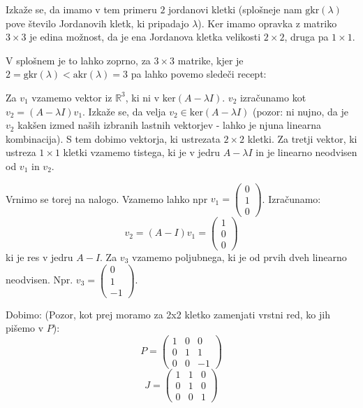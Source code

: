 \documentclass{article}
\begin{document}
\noindent
Izkaže se, da imamo v tem primeru $2$ jordanovi kletki (splošneje nam $\mathrm{gkr}(\lambda)$ pove število Jordanovih kletk, ki pripadajo $\lambda$). Ker imamo opravka z matriko $3 \times 3$ je edina možnost, da je ena Jordanova kletka velikosti $2 \times 2$, druga pa $1 \times1$.

\noindent
V splošnem je to lahko zoprno, za $3 \times 3$ matrike, kjer je $2 = \mathrm{gkr}(\lambda) < \mathrm{akr}(\lambda) = 3$ pa lahko povemo sledeči recept:

\noindent
Za $v_1$ vzamemo vektor iz $\mathbb{R}^3$, ki ni v $\mathrm{ker}(A-\lambda I)$. $v_2$ izračunamo kot $v_2 = (A-\lambda I) v_1$. Izkaže se, da velja $v_2 \in \mathrm{ker}(A-\lambda I)$ (pozor: ni nujno, da je $v_2$ kakšen izmed naših izbranih lastnih vektorjev - lahko je njuna linearna kombinacija). S tem dobimo vektorja, ki ustrezata $2 \times 2$ kletki.
Za tretji vektor, ki ustreza $1 \times 1$ kletki vzamemo tistega, ki je v jedru $A-\lambda I$ in je linearno neodvisen od $v_1$ in $v_2$.

\noindent
Vrnimo se torej na nalogo. Vzamemo lahko npr $v_1 = \begin{pmatrix} 0 \\ 1 \\ 0 \end{pmatrix}$.
Izračunamo:
\begin{equation*}
v_2 = (A-I)v_1 = \begin{pmatrix} 1 \\ 0 \\ 0 \end{pmatrix}
\end{equation*}
ki je res v jedru $A-I$.
Za $v_3$ vzamemo poljubnega, ki je od prvih dveh linearno neodvisen. Npr. $v_3 = \begin{pmatrix} 0 \\ 1 \\ -1 \end{pmatrix}$.

Dobimo: (Pozor, kot prej moramo za 2x2 kletko zamenjati vrstni red, ko jih pišemo v $P$):
\begin{equation*}
P = 
\begin{pmatrix}
1 & 0 & 0 \\
0 & 1 & 1 \\
0 & 0 & -1
\end{pmatrix}
\end{equation*}
\begin{equation*}
J = 
\begin{pmatrix}
1 & 1 & 0 \\
0 & 1 & 0 \\
0 & 0 & 1
\end{pmatrix}
\end{equation*}
\end{document}
